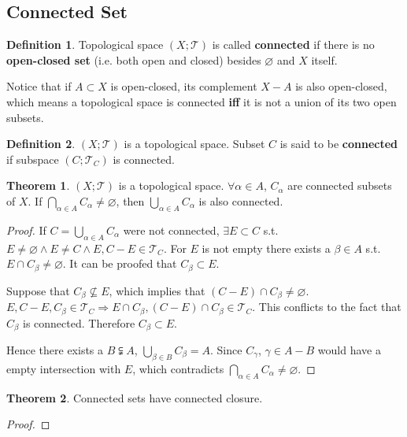 \documentclass{article}
\theoremstyle{plain}
\theoremstyle{definition}
\newtheorem{dfn}{Definition}[section] %
\newtheorem{thrm}{Theorem}[section] %
\begin{document}
\subsection{Connected Set}
\begin{dfn}\label{connected_space}
Topological space $(X;\mathscr{T})$ is called \textbf{connected} if there is no \textbf{open-closed set} (i.e. both open and closed) besides $\varnothing$ and $X$ itself. 
\end{dfn}
Notice that if $A\subset X$ is open-closed, its complement $X - A$ is also open-closed, which means a topological space is connected \textbf{iff} it is not a union of its two open subsets. 
\begin{dfn}\label{connected_set}
$(X;\mathscr{T})$ is a topological space. Subset $C$ is said to be \textbf{connected} if subspace $(C;\mathscr{T}_C)$ is connected. 
\end{dfn}
\begin{thrm}\label{union_connected}
$( X; \mathscr{T} )$ is a topological space. $\forall\alpha \in A$, $C_\alpha$ are connected subsets of $X$. If $\bigcap\limits_{ \alpha \in A} C_\alpha \neq \varnothing$, then $\bigcup\limits_{\alpha \in A} C_\alpha$ is also connected. 
\end{thrm}
\begin{proof}
If $C = \bigcup\limits_{\alpha \in A} C_\alpha$ were not connected, $\exists E \subset C$ s.t. $E\neq \varnothing \wedge E \neq C \wedge E, C - E \in \mathscr{T}_C$. For $E$ is not empty there exists a $\beta \in A$ s.t. $E \cap C_\beta \neq \varnothing$. It can be proofed that $C_\beta \subset  E$.

Suppose that $C_\beta \nsubseteq  E$, which implies that $( C - E) \cap C_\beta \neq \varnothing$. 
$E, C - E, C_\beta \in \mathscr{T}_C 
	\Rightarrow 
	E\cap C_\beta, ( C - E) \cap C_\beta \in \mathscr{T}_C$. 
This conflicts to the fact that $C_\beta$ is connected. Therefore $C_\beta \subset  E$. 

Hence there exists a $B \subsetneqq A$, $\bigcup\limits_{ \beta \in B} C_\beta = A$. Since $C_\gamma$, $\gamma \in A - B$ would have a empty intersection with $E$, which contradicts $\bigcap\limits_{ \alpha \in A} C_\alpha \neq \varnothing$.
\end{proof}
\begin{thrm}\label{closure_connected}
Connected sets have connected closure.
\end{thrm}
\begin{proof}

\end{proof}
\end{document}
